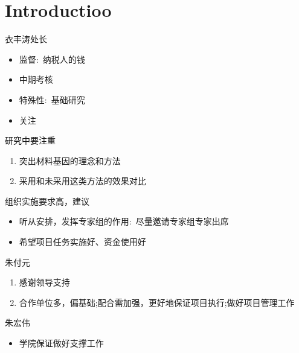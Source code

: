 \documentclass[10pt,a4paper]{article}
\begin{document}


\setcounter{section}{-1}
\section{Introductioo}
衣丰涛\;处长
\begin{itemize}
	\item 监督:~纳税人的钱
	\item 中期考核
	\item 特殊性:~基础研究
	\item 关注
\end{itemize}
研究中要注重
\begin{enumerate}
	\item 突出材料基因的理念和方法
	\item 采用和未采用这类方法的效果对比
\end{enumerate}
组织实施要求高，建议
\begin{itemize}
	\item 听从安排，发挥专家组的作用:~尽量邀请专家组专家出席
	\item 希望项目任务实施好、资金使用好
\end{itemize}

朱付元
\begin{enumerate}
	\item 感谢领导支持
	\item 合作单位多，偏基础;配合需加强，更好地保证项目执行;做好项目管理工作
\end{enumerate}

朱宏伟
\begin{itemize}
	\item 学院保证做好支撑工作
\end{itemize}
\end{document}
